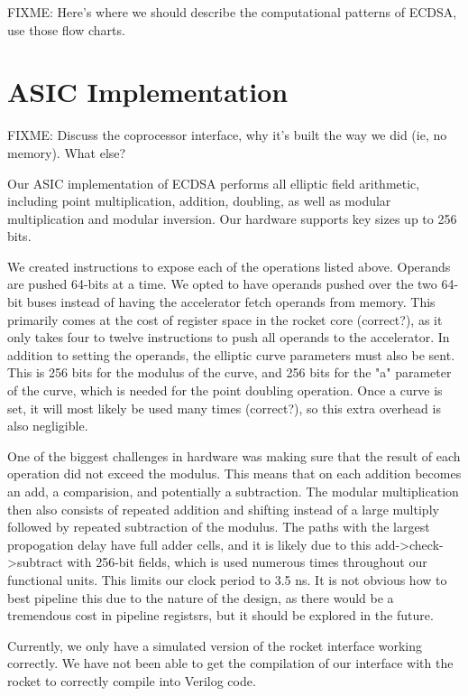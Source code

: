 \documentclass[twocolumn]{article}
\begin{document}
FIXME: Here's where we should describe the computational patterns of
ECDSA, use those flow charts.

\section{ASIC Implementation}

FIXME: Discuss the coprocessor interface, why it's built the way we
did (ie, no memory).  What else?

Our ASIC implementation of ECDSA performs all elliptic field arithmetic,
including point multiplication, addition, doubling, as well as modular
multiplication and modular inversion. Our hardware supports key sizes
up to 256 bits. 

We created instructions to expose each of the operations listed above. Operands
are pushed 64-bits at a time. We opted to have operands pushed over the two 64-bit
buses instead of having the accelerator fetch operands from memory. This primarily 
comes at the cost of register space in the rocket core (correct?), as it only takes 
four to twelve instructions to push all operands to the accelerator. In addition to 
setting the operands, the elliptic curve parameters must also be sent. This is 256 bits
for the modulus of the curve, and 256 bits for the "a" parameter of the curve, which
is needed for the point doubling operation. Once a curve is set, it will most likely
be used many times (correct?), so this extra overhead is also negligible. 

One of the biggest challenges in hardware was making sure that the result of each 
operation did not exceed the modulus. This means that on each addition becomes an 
add, a comparision, and potentially a subtraction. The modular multiplication then 
also consists of repeated addition and shifting instead of a large multiply followed
by repeated subtraction of the modulus. The paths with the largest propogation delay
have full adder cells, and it is likely due to this add->check->subtract with 
256-bit fields, which is used numerous times throughout our functional units. This 
limits our clock period to 3.5 ns. It is not obvious how to best pipeline this due 
to the nature of the design, as there would be a tremendous cost in pipeline registsrs, 
but it should be explored in the future. 

Currently, we only have a simulated version of the rocket interface working correctly. 
We have not been able to get the compilation of our interface with the rocket to correctly
compile into Verilog code. 
\end{document}
